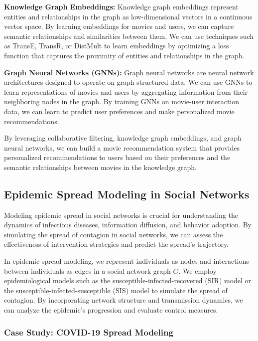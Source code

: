 \documentclass[12pt]{book} %
\begin{document}
\textbf{Knowledge Graph Embeddings:} Knowledge graph embeddings represent entities and relationships in the graph as low-dimensional vectors in a continuous vector space. By learning embeddings for movies and users, we can capture semantic relationships and similarities between them. We can use techniques such as TransE, TransR, or DistMult to learn embeddings by optimizing a loss function that captures the proximity of entities and relationships in the graph.

\textbf{Graph Neural Networks (GNNs):} Graph neural networks are neural network architectures designed to operate on graph-structured data. We can use GNNs to learn representations of movies and users by aggregating information from their neighboring nodes in the graph. By training GNNs on movie-user interaction data, we can learn to predict user preferences and make personalized movie recommendations.

By leveraging collaborative filtering, knowledge graph embeddings, and graph neural networks, we can build a movie recommendation system that provides personalized recommendations to users based on their preferences and the semantic relationships between movies in the knowledge graph.


\subsection{Epidemic Spread Modeling in Social Networks}

Modeling epidemic spread in social networks is crucial for understanding the dynamics of infectious diseases, information diffusion, and behavior adoption. By simulating the spread of contagion in social networks, we can assess the effectiveness of intervention strategies and predict the spread's trajectory.

In epidemic spread modeling, we represent individuals as nodes and interactions between individuals as edges in a social network graph \(G\). We employ epidemiological models such as the susceptible-infected-recovered (SIR) model or the susceptible-infected-susceptible (SIS) model to simulate the spread of contagion. By incorporating network structure and transmission dynamics, we can analyze the epidemic's progression and evaluate control measures.

\subsubsection{Case Study: COVID-19 Spread Modeling}
\end{document}
